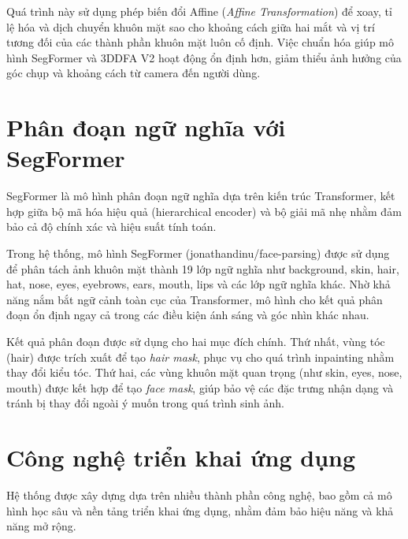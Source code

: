\documentclass[../main.tex]{subfiles}
\begin{document}
Quá trình này sử dụng phép biến đổi Affine (\textit{Affine Transformation}) để xoay, tỉ lệ hóa và dịch chuyển khuôn mặt sao cho khoảng cách giữa hai mắt và vị trí tương đối của các thành phần khuôn mặt luôn cố định. Việc chuẩn hóa giúp mô hình SegFormer và 3DDFA V2 hoạt động ổn định hơn, giảm thiểu ảnh hưởng của góc chụp và khoảng cách từ camera đến người dùng.


\section{Phân đoạn ngữ nghĩa với SegFormer}
SegFormer \cite{xie2021segformer} là mô hình phân đoạn ngữ nghĩa dựa trên kiến trúc Transformer, kết hợp giữa bộ mã hóa hiệu quả (hierarchical encoder) và bộ giải mã nhẹ nhằm đảm bảo cả độ chính xác và hiệu suất tính toán.

Trong hệ thống, mô hình SegFormer (jonathandinu/face-parsing) được sử dụng để phân tách ảnh khuôn mặt thành 19 lớp ngữ nghĩa như background, skin, hair, hat, nose, eyes, eyebrows, ears, mouth, lips và các lớp ngữ nghĩa khác. Nhờ khả năng nắm bắt ngữ cảnh toàn cục của Transformer, mô hình cho kết quả phân đoạn ổn định ngay cả trong các điều kiện ánh sáng và góc nhìn khác nhau.

Kết quả phân đoạn được sử dụng cho hai mục đích chính. Thứ nhất, vùng tóc (hair) được trích xuất để tạo \textit{hair mask}, phục vụ cho quá trình inpainting nhằm thay đổi kiểu tóc. Thứ hai, các vùng khuôn mặt quan trọng (như skin, eyes, nose, mouth) được kết hợp để tạo \textit{face mask}, giúp bảo vệ các đặc trưng nhận dạng và tránh bị thay đổi ngoài ý muốn trong quá trình sinh ảnh.

\section{Công nghệ triển khai ứng dụng}
Hệ thống được xây dựng dựa trên nhiều thành phần công nghệ, bao gồm cả mô hình học sâu và nền tảng triển khai ứng dụng, nhằm đảm bảo hiệu năng và khả năng mở rộng.
\end{document}
